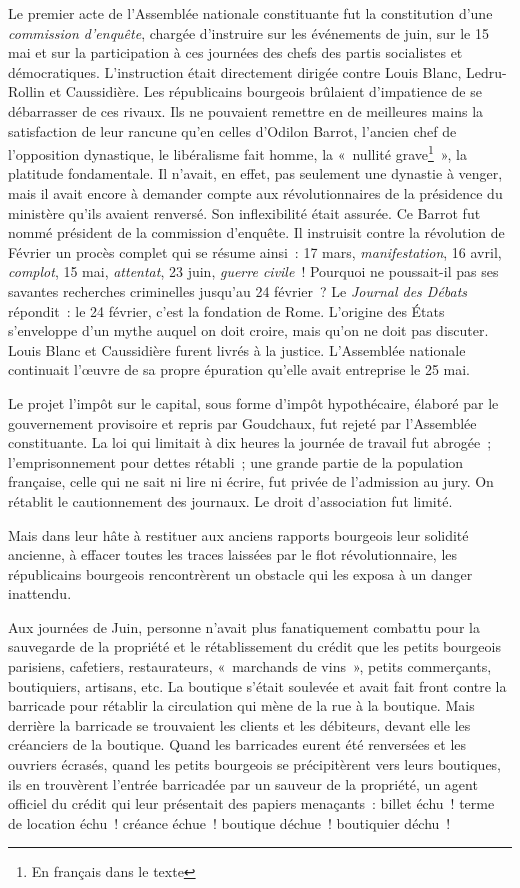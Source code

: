 \documentclass[french,twoside]{book} %
\begin{document}
Le premier acte de l’Assemblée nationale constituante fut la constitution d’une \emph{commission d’enquête}, chargée d’instruire sur les événements de juin, sur le 15 mai et sur la participation à ces journées des chefs des partis socialistes et démocratiques. L’instruction était directement dirigée contre Louis Blanc, Ledru-Rollin et Caussidière. Les républicains bourgeois brûlaient d’impatience de se débarrasser de ces rivaux. Ils ne pouvaient remettre en de meilleures mains la satisfaction de leur rancune qu’en celles d’Odilon Barrot, l’ancien chef de l’opposition dynastique, le libéralisme fait homme, la « nullité grave\footnote{En français dans le texte} », la platitude fondamentale. Il n’avait, en effet, pas seulement une dynastie à venger, mais il avait encore à demander compte aux révolutionnaires de la présidence du ministère qu’ils avaient renversé. Son inflexibilité était assurée. Ce Barrot fut nommé président de la commission d’enquête. Il instruisit contre la révolution de Février un procès complet qui se résume ainsi : 17 mars, \emph{manifestation}, 16 avril, \emph{complot}, 15 mai, \emph{attentat}, 23 juin, \emph{guerre civile} ! Pourquoi ne poussait-il pas ses savantes recherches criminelles jusqu’au 24 février ? Le \emph{Journal des Débats} répondit : le 24 février, c’est la fondation de Rome. L’origine des États s’enveloppe d’un mythe auquel on doit croire, mais qu’on ne doit pas discuter. Louis Blanc et Caussidière furent livrés à la justice. L’Assemblée nationale continuait l’œuvre de sa propre épuration qu’elle avait entreprise le 25 mai.\par
Le projet l’impôt sur le capital, sous forme d’impôt hypothécaire, élaboré par le gouvernement provisoire et repris par Goudchaux, fut rejeté par l’Assemblée constituante. La loi qui limitait à dix heures la journée de travail fut abrogée ; l’emprisonnement pour dettes rétabli ; une grande partie de la population française, celle qui ne sait ni lire ni écrire, fut privée de l’admission au jury. On rétablit le cautionnement des journaux. Le droit d’association fut limité.\par
Mais dans leur hâte à restituer aux anciens rapports bourgeois leur solidité ancienne, à effacer toutes les traces laissées par le flot révolutionnaire, les républicains bourgeois rencontrèrent un obstacle qui les exposa à un danger inattendu.\par
Aux journées de Juin, personne n’avait plus fanatiquement combattu pour la sauvegarde de la propriété et le rétablissement du crédit que les petits bourgeois parisiens, cafetiers, restaurateurs, « marchands de vins », petits commerçants, boutiquiers, artisans, etc. La boutique s’était soulevée et avait fait front contre la barricade pour rétablir la circulation qui mène de la rue à la boutique. Mais derrière la barricade se trouvaient les clients et les débiteurs, devant elle les créanciers de la boutique. Quand les barricades eurent été renversées et les ouvriers écrasés, quand les petits bourgeois se précipitèrent vers leurs boutiques, ils en trouvèrent l’entrée barricadée par un sauveur de la propriété, un agent officiel du crédit qui leur présentait des papiers menaçants : billet échu ! terme de location échu ! créance échue ! boutique déchue ! boutiquier déchu !\par
\end{document}

